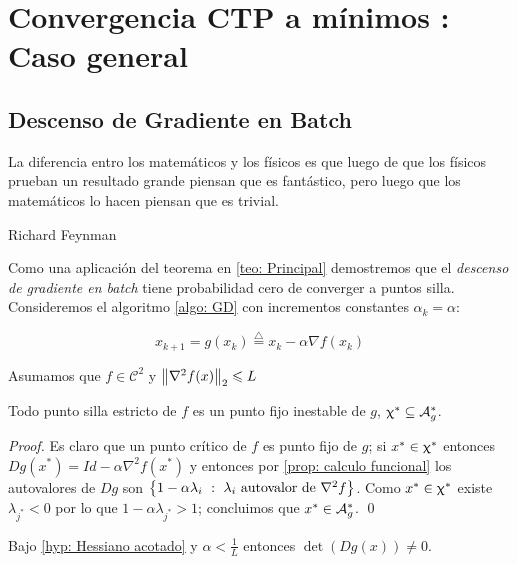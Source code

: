 \chapter{Convergencia CTP a m\'inimos : Caso general}\label{ch: aplicaciones}
\section{Descenso de Gradiente en Batch}

\epigraph{La diferencia entro los matem\'aticos y los f\'isicos es que luego de que los f\'isicos prueban un resultado grande piensan que es fant\'astico, pero luego que los matem\'aticos lo hacen piensan que es trivial.}{Richard Feynman}

Como una aplicaci\'on del teorema en \ref{teo: Principal} demostremos que el \textit{descenso de gradiente en batch} tiene probabilidad cero de converger a puntos silla. Consideremos el algoritmo \ref{algo: GD} con incrementos constantes $\alpha_k = \alpha$:

\begin{equation}
	\label{eq: GD}
	x_{k+1} = g(x_k) \stackrel{\triangle}{=} x_k - \alpha \nabla f(x_k)
\end{equation}

\begin{hyp}
	\label{hyp: Hessiano acotado}
	Asumamos que $f \in \mathcal{C}^2$ y $\left\lVert\nabla^2 f(x)\right\rVert_2 \leqslant L$
\end{hyp}

\begin{proposition}
	\label{prop: GD los puntos silla estrictos son fijos inestables}
	Todo punto silla estricto de $f$ es un punto fijo inestable de $g$, \ie $\upchi^* \subseteq \mathcal{A}_{g}^{*}$.
\end{proposition}

\begin{proof}
	Es claro que un punto cr\'itico de $f$ es punto fijo de $g$; si $x^* \in \upchi^*$ entonces $Dg(x^*) = Id - \alpha \nabla^2 f(x^*)$ y entonces por \ref{prop: calculo funcional} los autovalores de $Dg$ son $\left\lbrace1 - \alpha \lambda_i ~:~ \lambda_i \text{ autovalor de $\nabla^2 f$}\right\rbrace$. Como $x^* \in \upchi^*$ existe $\lambda_{j^*} < 0$ por lo que $1 - \alpha\lambda_{j^*} >1$; concluimos que $x^{*} \in \mathcal{A}_{g}^{*}$. \qed
	
\end{proof}

\begin{proposition}
	\label{prop: GD g es difeo local}
	Bajo \ref{hyp: Hessiano acotado} y $\alpha < \frac{1}{L}$ entonces $\det \left(Dg (x)\right) \neq 0$.
\end{proposition}

